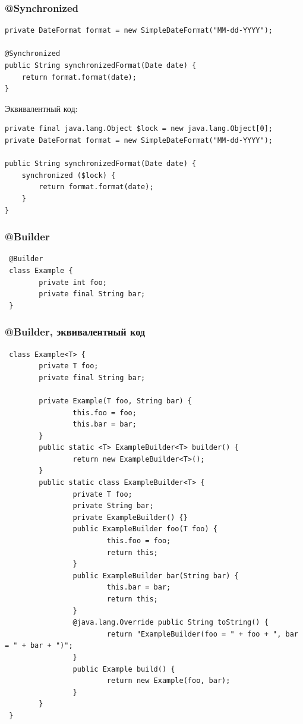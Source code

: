 \documentclass[xetex,mathserif,serif]{beamer}
\begin{document}
	\begin{frame}[fragile]
		\frametitle{@Synchronized}
		\begin{small}
			\begin{verbatim}
private DateFormat format = new SimpleDateFormat("MM-dd-YYYY");

@Synchronized
public String synchronizedFormat(Date date) {
    return format.format(date);
}
		\end{verbatim}
		Эквивалентный код:
		\begin{verbatim}
private final java.lang.Object $lock = new java.lang.Object[0];
private DateFormat format = new SimpleDateFormat("MM-dd-YYYY");

public String synchronizedFormat(Date date) {
    synchronized ($lock) {  
        return format.format(date);
    }
}
			\end{verbatim}
		\end{small}
	\end{frame}

	\begin{frame}[fragile]
		\frametitle{@Builder}
		\begin{verbatim}
 @Builder
 class Example {
        private int foo;
        private final String bar;
 }
		\end{verbatim}
	\end{frame}

	\begin{frame}[fragile]
		\frametitle{@Builder, эквивалентный код}
		\begin{tiny}
			\begin{verbatim}
 class Example<T> {
        private T foo;
        private final String bar;
        
        private Example(T foo, String bar) {
                this.foo = foo;
                this.bar = bar;
        }        
        public static <T> ExampleBuilder<T> builder() {
                return new ExampleBuilder<T>();
        }        
        public static class ExampleBuilder<T> {
                private T foo;
                private String bar;
                private ExampleBuilder() {}
                public ExampleBuilder foo(T foo) {
                        this.foo = foo;
                        return this;
                }                
                public ExampleBuilder bar(String bar) {
                        this.bar = bar;
                        return this;
                }                
                @java.lang.Override public String toString() {
                        return "ExampleBuilder(foo = " + foo + ", bar = " + bar + ")";
                }                
                public Example build() {
                        return new Example(foo, bar);
                }
        }
 } 
			\end{verbatim}
		\end{tiny}
	\end{frame}
\end{document}
